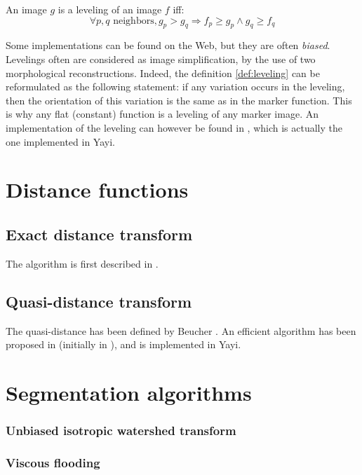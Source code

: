\begin{definition}[Leveling]
An image $g$ is a leveling of an image $f$ iff:
\[
	\forall p,q \text{ neighbors}, g_p > g_q \Rightarrow f_p \geq g_p \wedge g_q \geq f_q
\]
\label{def:leveling}
\end{definition}

Some implementations can be found on the Web, but they are often \textit{biased}. Levelings often are considered as image simplification, by the use of two morphological reconstructions. 
Indeed, the definition \ref{def:leveling} can be reformulated as the following statement: if any variation occurs in the leveling, then the orientation of this variation is the same as in the marker function. This is why any flat (constant) function is a leveling of any marker image.
An implementation of the leveling can however be found in \cite{gomila_2001}, which is actually the one implemented in Yayi. 


\chapter{Distance functions}

\section{Exact distance transform}
The algorithm is first described in \cite{raffi:phd:2007}.

\section{Quasi-distance transform}
The quasi-distance has been defined by Beucher \cite{beucher:residues:2005}. An efficient algorithm has been proposed in \cite{enficiaud:qd:2010} (initially in \cite{raffi:phd:2007}), and is implemented in Yayi. 

\chapter{Segmentation algorithms}

\subsection{Unbiased isotropic watershed transform}


\subsection{Viscous flooding}
